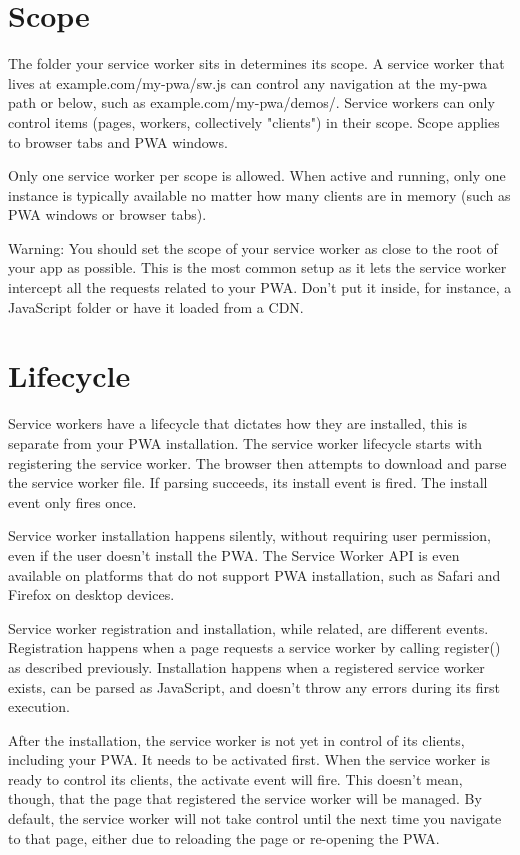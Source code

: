 \documentclass{article}
\begin{document}
\section*{Scope}

The folder your service worker sits in determines its scope. A service worker that lives at example.com/my-pwa/sw.js can control any navigation at the my-pwa path or below, such as example.com/my-pwa/demos/. Service workers can only control items (pages, workers, collectively "clients") in their scope. Scope applies to browser tabs and PWA windows.

Only one service worker per scope is allowed. When active and running, only one instance is typically available no matter how many clients are in memory (such as PWA windows or browser tabs).

Warning: You should set the scope of your service worker as close to the root of your app as possible. This is the most common setup as it lets the service worker intercept all the requests related to your PWA. Don't put it inside, for instance, a JavaScript folder or have it loaded from a CDN.

\section*{Lifecycle}

Service workers have a lifecycle that dictates how they are installed, this is separate from your PWA installation. The service worker lifecycle starts with registering the service worker. The browser then attempts to download and parse the service worker file. If parsing succeeds, its install event is fired. The install event only fires once.

Service worker installation happens silently, without requiring user permission, even if the user doesn't install the PWA. The Service Worker API is even available on platforms that do not support PWA installation, such as Safari and Firefox on desktop devices.

Service worker registration and installation, while related, are different events. Registration happens when a page requests a service worker by calling register() as described previously. Installation happens when a registered service worker exists, can be parsed as JavaScript, and doesn't throw any errors during its first execution.

After the installation, the service worker is not yet in control of its clients, including your PWA. It needs to be activated first. When the service worker is ready to control its clients, the activate event will fire. This doesn't mean, though, that the page that registered the service worker will be managed. By default, the service worker will not take control until the next time you navigate to that page, either due to reloading the page or re-opening the PWA.
\end{document}
